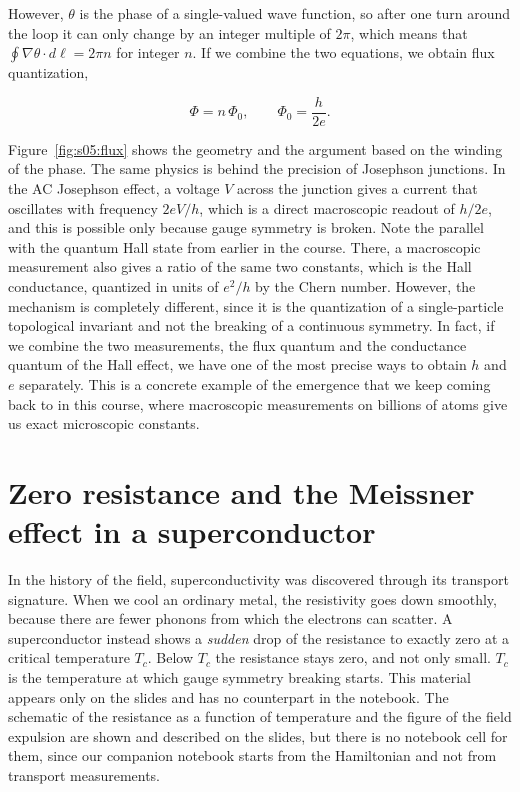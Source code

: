 However, $\theta$ is the phase of a single-valued wave function, so after one turn around the loop
it can only change by an integer multiple of $2\pi$, which means that $\oint \nabla\theta\cdot
d\boldsymbol\ell = 2\pi n$ for integer $n$. If we combine the two equations, we obtain flux
quantization,

\begin{equation}
\Phi = n\,\Phi_0, \qquad \Phi_0 = \frac{h}{2e}.
\end{equation}

Figure~\ref{fig:s05:flux} shows the geometry and the argument based on the winding of the phase.
The same physics is behind the precision of Josephson junctions. In the AC Josephson effect, a
voltage $V$ across the junction gives a current that oscillates with frequency $2eV/h$, which is a
direct macroscopic readout of $h/2e$, and this is possible only because gauge symmetry is broken. Note the parallel with the quantum Hall state from earlier in the course.
There, a macroscopic measurement also gives a ratio of the same two constants, which is the Hall
conductance, quantized in units of $e^2/h$ by the Chern number. However, the mechanism is completely
different, since it is the quantization of a single-particle topological invariant and not the
breaking of a continuous symmetry. In fact, if we combine the two measurements, the flux quantum and
the conductance quantum of the Hall effect, we have one of the most precise ways to obtain $h$ and
$e$ separately. This is a concrete example of the emergence that we keep coming back to in this
course, where macroscopic measurements on billions of atoms give us exact microscopic constants.



\section{Zero resistance and the Meissner effect in a superconductor}

In the history of the field, superconductivity was discovered through its transport signature. When
we cool an ordinary metal, the resistivity goes down smoothly, because there are fewer phonons from
which the electrons can scatter. A superconductor instead shows a \emph{sudden} drop of the
resistance to exactly zero at a critical temperature $T_c$. Below $T_c$ the resistance stays zero,
and not only small. $T_c$ is the temperature at which gauge symmetry breaking starts. This material
appears only on the slides and has no counterpart in the notebook. The schematic of the resistance
as a function of temperature and the figure of the field expulsion are shown and described on the
slides, but there is no notebook cell for them, since our companion notebook starts from the
Hamiltonian and not from transport measurements.

